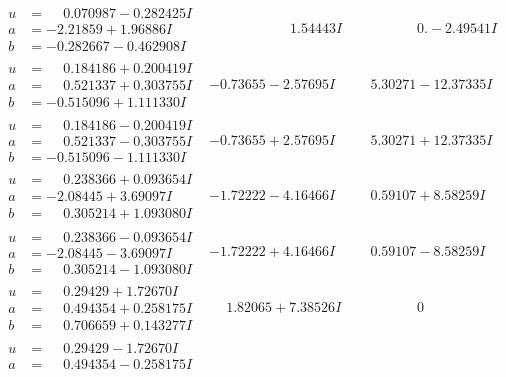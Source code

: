 \documentclass[1p]{elsarticle_modified}
\theoremstyle{definition}
\begin{document}
$$\begin{array}{c|c|c}
\begin{aligned}
u &= \phantom{-}0.070987 - 0.282425 I \\
a &= -2.21859 + 1.96886 I \\
b &= -0.282667 - 0.462908 I\end{aligned}
 & \phantom{-0.000000 -}1.54443 I & \phantom{-0.000000 } 0. - 2.49541 I \\ \hline\begin{aligned}
u &= \phantom{-}0.184186 + 0.200419 I \\
a &= \phantom{-}0.521337 + 0.303755 I \\
b &= -0.515096 + 1.111330 I\end{aligned}
 & -0.73655 - 2.57695 I & \phantom{-}5.30271 - 12.37335 I \\ \hline\begin{aligned}
u &= \phantom{-}0.184186 - 0.200419 I \\
a &= \phantom{-}0.521337 - 0.303755 I \\
b &= -0.515096 - 1.111330 I\end{aligned}
 & -0.73655 + 2.57695 I & \phantom{-}5.30271 + 12.37335 I \\ \hline\begin{aligned}
u &= \phantom{-}0.238366 + 0.093654 I \\
a &= -2.08445 + 3.69097 I \\
b &= \phantom{-}0.305214 + 1.093080 I\end{aligned}
 & -1.72222 - 4.16466 I & \phantom{-}0.59107 + 8.58259 I \\ \hline\begin{aligned}
u &= \phantom{-}0.238366 - 0.093654 I \\
a &= -2.08445 - 3.69097 I \\
b &= \phantom{-}0.305214 - 1.093080 I\end{aligned}
 & -1.72222 + 4.16466 I & \phantom{-}0.59107 - 8.58259 I \\ \hline\begin{aligned}
u &= \phantom{-}0.29429 + 1.72670 I \\
a &= \phantom{-}0.494354 + 0.258175 I \\
b &= \phantom{-}0.706659 + 0.143277 I\end{aligned}
 & \phantom{-}1.82065 + 7.38526 I & \phantom{-0.000000 } 0 \\ \hline\begin{aligned}
u &= \phantom{-}0.29429 - 1.72670 I \\
a &= \phantom{-}0.494354 - 0.258175 I \\

\end{aligned}
\end{array}$$
\end{document}
